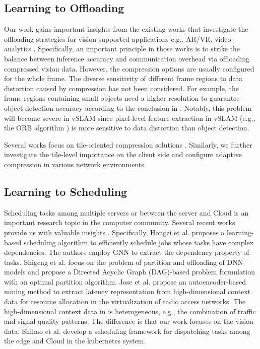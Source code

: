 \subsection{Learning to Offloading} 
Our work gains important insights from the existing works that investigate the offloading strategies for vision-supported applications e.g., AR/VR, video analytics \cite{guo2018small, galanopoulosautoml, wang2020joint, ren2021adaptive}. Specifically, an important principle in those works is to strike the balance between inference accuracy and communication overhead via offloading compressed vision data. However, the compression options are usually configured for the whole frame. The diverse sensitivity of different frame regions to data distortion caused by compression has not been considered. For example, the frame regions containing small objects need a higher resolution to guarantee object detection accuracy according to the conclusion in \cite{guo2018small}. Notably, this problem will become severe in vSLAM since pixel-level feature extraction in vSLAM (e.g., the ORB algorithm \cite{mur2017orb}) is more sensitive to data distortion than object detection. 

Several works focus on tile-oriented compression solutions \cite{liu2019edge, wang2021edgeduet, du2020server}. Similarly, we further investigate the tile-level importance on the client side and configure adaptive compression in various network environments.
 
\subsection{Learning to Scheduling} 
Scheduling tasks among multiple servers or between the server and Cloud is an important research topic in the computer community. Several recent works provide us with valuable insights \cite{mao2019learning}\cite{zhang2020towards}\cite{ayala2019vrain}\cite{shen2023collaborative}. Specifically, Hongzi et al. \cite{mao2019learning} proposes a learning-based scheduling algorithm to efficiently schedule jobs whose tasks have complex dependencies. The authors employ GNN to extract the dependency property of tasks. Shigeng et al. \cite{zhang2020towards} focus on the problem of partition and offloading of DNN models and propose a Directed Acyclic Graph (DAG)-based problem formulation with an optimal partition algorithm. Jose et al. \cite{ayala2019vrain} propose an autoencoder-based mining method to extract latency representation from high-dimensional context data for resource allocation in the virtualization of radio access networks. The high-dimensional context data in \cite{ayala2019vrain} is heterogeneous, e.g., the combination of traffic and signal quality patterns. The difference is that our work focuses on the vision data. Shihao et al. \cite{shen2023collaborative} develop a scheduling framework for dispatching tasks among the edge and Cloud in the kubernetes system. 

